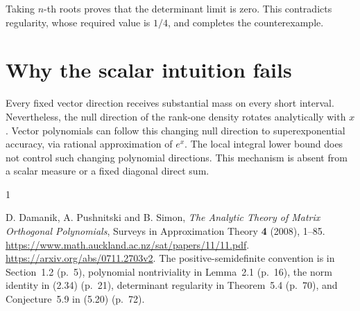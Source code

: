 \documentclass[11pt,a4paper]{article}
\begin{document}
Taking \(n\)-th roots proves that the determinant limit is zero. This
contradicts regularity, whose required value is \(1/4\), and completes
the counterexample.

\hypertarget{1035-why-the-scalar-intuition-fails}{%
\section{Why the scalar intuition
fails}\label{1035-why-the-scalar-intuition-fails}}

Every fixed vector direction receives substantial mass on every short
interval. Nevertheless, the null direction of the rank-one density
rotates analytically with \(x\). Vector polynomials can follow this
changing null direction to superexponential accuracy, via rational
approximation of \(e^x\). The local integral lower bound does not
control such changing polynomial directions. This mechanism is absent
from a scalar measure or a fixed diagonal direct sum.

\begin{thebibliography}{1}
\raggedright
{}
D. Damanik, A. Pushnitski and B. Simon,
\emph{The Analytic Theory of Matrix Orthogonal Polynomials},
Surveys in Approximation Theory \textbf{4} (2008), 1--85.
\url{https://www.math.auckland.ac.nz/sat/papers/11/11.pdf}.
\url{https://arxiv.org/abs/0711.2703v2}.
The positive-semidefinite convention is in Section~1.2 (p.~5),
polynomial nontriviality in Lemma~2.1 (p.~16),
the norm identity in (2.34) (p.~21), determinant regularity in
Theorem~5.4 (p.~70), and Conjecture~5.9 in (5.20) (p.~72).
\end{thebibliography}
\end{document}
